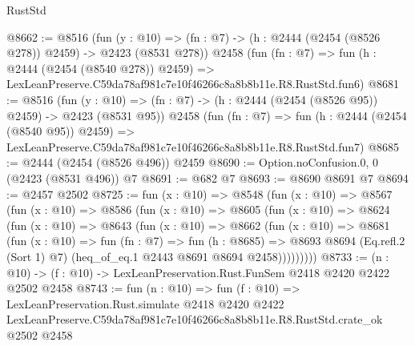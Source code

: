 \begin{lexlean}{RustStd}
\begin{coremodule}
@8662 := @8516
    (fun (y : @10) => (fn : @7) -> (h : @2444 (@2454 (@8526 @278)) @2459) -> @2423 (@8531 @278))
    @2458
    (fun (fn : @7) =>
    fun (h : @2444 (@2454 (@8540 @278)) @2459) =>
    LexLeanPreserve.C59da78af981c7e10f46266c8a8b8b11e.R8.RustStd.fun6)
@8681 := @8516
    (fun (y : @10) => (fn : @7) -> (h : @2444 (@2454 (@8526 @95)) @2459) -> @2423 (@8531 @95))
    @2458
    (fun (fn : @7) =>
    fun (h : @2444 (@2454 (@8540 @95)) @2459) =>
    LexLeanPreserve.C59da78af981c7e10f46266c8a8b8b11e.R8.RustStd.fun7)
@8685 := @2444 (@2454 (@8526 @496)) @2459
@8690 := Option.noConfusion.{0, 0} (@2423 (@8531 @496)) @7
@8691 := @682 @7
@8693 := @8690 @8691 @7
@8694 := @2457 @2502
@8725 := fun (x : @10) =>
  @8548
    (fun (x : @10) =>
    @8567
      (fun (x : @10) =>
      @8586
        (fun (x : @10) =>
        @8605
          (fun (x : @10) =>
          @8624
            (fun (x : @10) =>
            @8643
              (fun (x : @10) =>
              @8662
                (fun (x : @10) =>
                @8681
                  (fun (x : @10) =>
                  fun (fn : @7) =>
                  fun (h : @8685) =>
                  @8693
                    @8694
                    (Eq.refl.{2} (Sort 1) @7)
                    (heq_of_eq.{1} @2443 @8691 @8694 @2458)))))))))
@8733 := (n : @10) -> (f : @10) -> LexLeanPreservation.Rust.FunSem @2418 @2420 @2422 @2502 @2458
@8743 := fun (n : @10) =>
  fun (f : @10) =>
  LexLeanPreservation.Rust.simulate
    @2418
    @2420
    @2422
    LexLeanPreserve.C59da78af981c7e10f46266c8a8b8b11e.R8.RustStd.crate_ok
    @2502
    @2458
\end{coremodule}
\end{lexlean}
